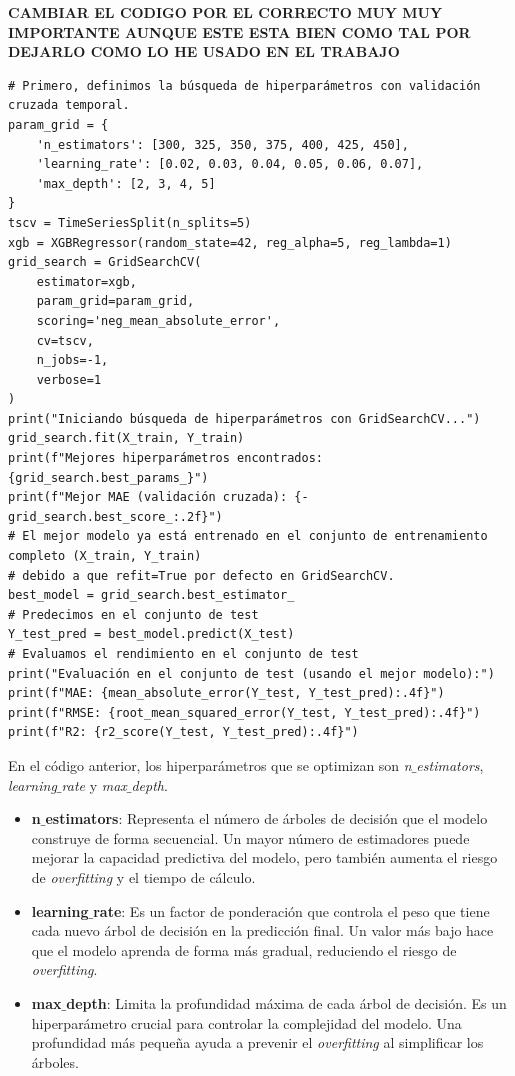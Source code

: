 \textbf{CAMBIAR EL CODIGO POR EL CORRECTO MUY MUY IMPORTANTE AUNQUE ESTE ESTA BIEN COMO TAL POR DEJARLO COMO LO HE USADO EN EL TRABAJO}
\begin{lstlisting}[caption={Búsqueda óptima de hiperparámetros y validación cruzada en el modelo XGBoost }, label={TSSyGSXGBoost}]
# Primero, definimos la búsqueda de hiperparámetros con validación cruzada temporal.
param_grid = {
    'n_estimators': [300, 325, 350, 375, 400, 425, 450],
    'learning_rate': [0.02, 0.03, 0.04, 0.05, 0.06, 0.07],
    'max_depth': [2, 3, 4, 5]
}
tscv = TimeSeriesSplit(n_splits=5) 
xgb = XGBRegressor(random_state=42, reg_alpha=5, reg_lambda=1)
grid_search = GridSearchCV(
    estimator=xgb,
    param_grid=param_grid,
    scoring='neg_mean_absolute_error',
    cv=tscv,
    n_jobs=-1,
    verbose=1
)
print("Iniciando búsqueda de hiperparámetros con GridSearchCV...")
grid_search.fit(X_train, Y_train)
print(f"Mejores hiperparámetros encontrados: {grid_search.best_params_}")
print(f"Mejor MAE (validación cruzada): {-grid_search.best_score_:.2f}")
# El mejor modelo ya está entrenado en el conjunto de entrenamiento completo (X_train, Y_train)
# debido a que refit=True por defecto en GridSearchCV.
best_model = grid_search.best_estimator_
# Predecimos en el conjunto de test
Y_test_pred = best_model.predict(X_test)
# Evaluamos el rendimiento en el conjunto de test
print("Evaluación en el conjunto de test (usando el mejor modelo):")
print(f"MAE: {mean_absolute_error(Y_test, Y_test_pred):.4f}")
print(f"RMSE: {root_mean_squared_error(Y_test, Y_test_pred):.4f}")
print(f"R2: {r2_score(Y_test, Y_test_pred):.4f}")
\end{lstlisting}
En el código anterior, los hiperparámetros que se optimizan son \textit{n$\_$estimators}, \textit{learning$\_$rate} y \textit{max$\_$depth}.
\begin{itemize}
    \item \textbf{n$\_$estimators}: Representa el número de árboles de decisión que el modelo construye de forma secuencial. Un mayor número de estimadores puede mejorar la capacidad predictiva del modelo, pero también aumenta el riesgo de \textit{overfitting} y el tiempo de cálculo.
    \item \textbf{learning$\_$rate}: Es un factor de ponderación que controla el peso que tiene cada nuevo árbol de decisión en la predicción final. Un valor más bajo hace que el modelo aprenda de forma más gradual, reduciendo el riesgo de \textit{overfitting}.
    \item \textbf{max$\_$depth}: Limita la profundidad máxima de cada árbol de decisión. Es un hiperparámetro crucial para controlar la complejidad del modelo. Una profundidad más pequeña ayuda a prevenir el \textit{overfitting} al simplificar los árboles.
\end{itemize}
%
%
%
